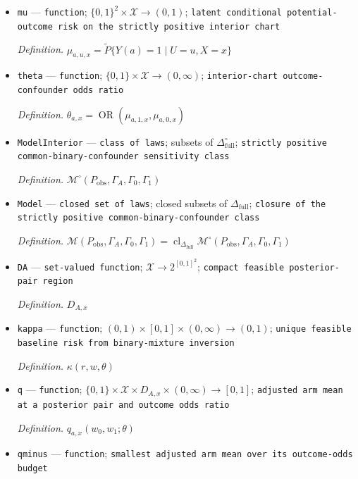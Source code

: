 \documentclass{article}
\begin{document}
\begin{itemize}
  \item \texttt{mu} --- \texttt{function}; \(\{0,1\}^2\times\mathcal X\to(0,1)\); \texttt{latent conditional potential-\allowbreak{}outcome risk on the strictly positive interior chart}
  \par\smallskip\noindent\emph{Definition.} \(\mu_{a,u,x}=\widetilde P\{Y(a)=1\mid U=u,X=x\}\)
  \item \texttt{theta} --- \texttt{function}; \(\{0,1\}\times\mathcal X\to(0,\infty)\); \texttt{interior-\allowbreak{}chart outcome-\allowbreak{}confounder odds ratio}
  \par\smallskip\noindent\emph{Definition.} \(\theta_{a,x}=\operatorname{OR}(\mu_{a,1,x},\mu_{a,0,x})\)
  \item \texttt{ModelInterior} --- \texttt{class of laws}; subsets of \(\Delta_{\mathrm{full}}^{\circ}\); \texttt{strictly positive common-\allowbreak{}binary-\allowbreak{}confounder sensitivity class}
  \par\smallskip\noindent\emph{Definition.} \(\mathcal M^{\circ}(P_{\mathrm{obs}},\Gamma_A,\Gamma_0,\Gamma_1)\)
  \item \texttt{Model} --- \texttt{closed set of laws}; closed subsets of \(\Delta_{\mathrm{full}}\); \texttt{closure of the strictly positive common-\allowbreak{}binary-\allowbreak{}confounder class}
  \par\smallskip\noindent\emph{Definition.} \(\mathcal M(P_{\mathrm{obs}},\Gamma_A,\Gamma_0,\Gamma_1)=\operatorname{cl}_{\Delta_{\mathrm{full}}}\mathcal M^{\circ}(P_{\mathrm{obs}},\Gamma_A,\Gamma_0,\Gamma_1)\)
  \item \texttt{DA} --- \texttt{set-\allowbreak{}valued function}; \(\mathcal X\to2^{[0,1]^2}\); \texttt{compact feasible posterior-\allowbreak{}pair region}
  \par\smallskip\noindent\emph{Definition.} \(D_{A,x}\)
  \item \texttt{kappa} --- \texttt{function}; \((0,1)\times[0,1]\times(0,\infty)\to(0,1)\); \texttt{unique feasible baseline risk from binary-\allowbreak{}mixture inversion}
  \par\smallskip\noindent\emph{Definition.} \(\kappa(r,w,\theta)\)
  \item \texttt{q} --- \texttt{function}; \(\{0,1\}\times\mathcal X\times D_{A,x}\times(0,\infty)\to[0,1]\); \texttt{adjusted arm mean at a posterior pair and outcome odds ratio}
  \par\smallskip\noindent\emph{Definition.} \(q_{a,x}(w_0,w_1;\theta)\)
  \item \texttt{qminus} --- \texttt{function}; \texttt{smallest adjusted arm mean over its outcome-\allowbreak{}odds budget}

\end{itemize}
\end{document}
